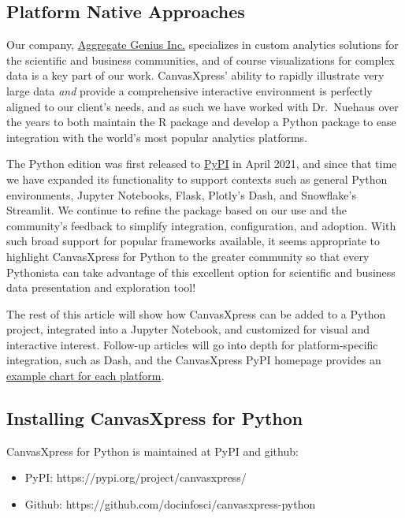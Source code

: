 \documentclass[
  letterpaper,
  DIV=11,
  numbers=noendperiod]{scrartcl}
\providecommand{\tightlist}{%
  \setlength{\itemsep}{0pt}\setlength{\parskip}{0pt}}\usepackage{longtable,booktabs,array}
\begin{document}
\hypertarget{platform-native-approaches}{%
\subsection{Platform Native
Approaches}\label{platform-native-approaches}}

Our company, \href{https://www.aggregate-genius.com/}{Aggregate Genius
Inc.} specializes in custom analytics solutions for the scientific and
business communities, and of course visualizations for complex data is a
key part of our work. CanvasXpress' ability to rapidly illustrate very
large data \emph{and} provide a comprehensive interactive environment is
perfectly aligned to our client's needs, and as such we have worked with
Dr.~Nuehaus over the years to both maintain the R package and develop a
Python package to ease integration with the world's most popular
analytics platforms.

The Python edition was first released to
\href{https://pypi.org/project/canvasxpress/}{PyPI} in April 2021, and
since that time we have expanded its functionality to support contexts
such as general Python environments, Jupyter Notebooks, Flask, Plotly's
Dash, and Snowflake's Streamlit. We continue to refine the package based
on our use and the community's feedback to simplify integration,
configuration, and adoption. With such broad support for popular
frameworks available, it seems appropriate to highlight CanvasXpress for
Python to the greater community so that every Pythonista can take
advantage of this excellent option for scientific and business data
presentation and exploration tool!

The rest of this article will show how CanvasXpress can be added to a
Python project, integrated into a Jupyter Notebook, and customized for
visual and interactive interest. Follow-up articles will go into depth
for platform-specific integration, such as Dash, and the CanvasXpress
PyPI homepage provides an
\href{https://pypi.org/project/canvasxpress/}{example chart for each
platform}.

\hypertarget{installing-canvasxpress-for-python}{%
\subsection{Installing CanvasXpress for
Python}\label{installing-canvasxpress-for-python}}

CanvasXpress for Python is maintained at PyPI and github:

\begin{itemize}
\tightlist
\item
  PyPI: https://pypi.org/project/canvasxpress/
\item
  Github: https://github.com/docinfosci/canvasxpress-python
\end{itemize}
\end{document}
